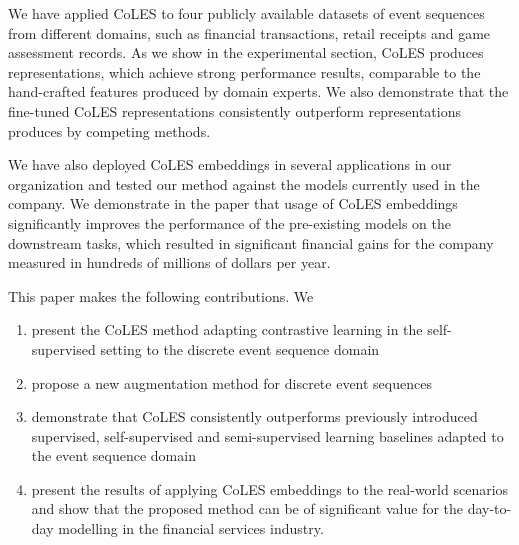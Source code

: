 \documentclass[sigconf, anonymous]{acmart}
\begin{document}
We have applied CoLES to four publicly available datasets of event sequences from different
domains, such as financial transactions, retail receipts and game assessment records. As
we show in the experimental section, CoLES produces representations, which achieve strong
performance results, comparable to the hand-crafted features produced by domain experts.
We also demonstrate that the fine-tuned CoLES representations consistently outperform
representations produces by competing methods.
%


We have also deployed CoLES embeddings 
in several applications in our organization 
and tested our method against the models currently used in the company. 
We demonstrate in the paper that usage of CoLES embeddings significantly improves the performance of the pre-existing models on the downstream tasks, which resulted in significant financial gains for the company measured in hundreds of millions of dollars per year.


This paper makes the following contributions. We
\begin{enumerate}

\item present the CoLES method adapting contrastive learning in the self-supervised setting to the discrete event sequence domain

\item propose a new
augmentation method for discrete event sequences
\item demonstrate that CoLES consistently outperforms previously introduced supervised, self-supervised and semi-supervised learning baselines adapted to the event sequence domain

\item present the results of applying CoLES embeddings to the real-world scenarios and show that the proposed method can be of significant value for the day-to-day modelling in the financial services industry.
\end{enumerate}
\end{document}
